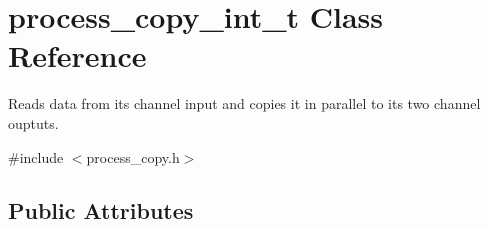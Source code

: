 \hypertarget{structprocess__copy__int__t}{\section{process\-\_\-copy\-\_\-int\-\_\-t Class Reference}
\label{structprocess__copy__int__t}
}


Reads data from its channel input and copies it in parallel to its two channel ouptuts.  




{\ttfamily \#include $<$process\-\_\-copy.\-h$>$}

\subsection*{Public Attributes}
